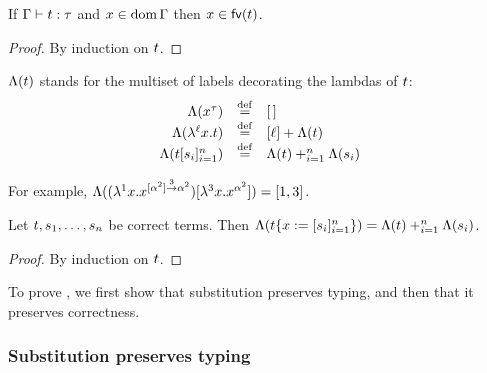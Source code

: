 \begin{lemma}[Relevance]
If $\Gamma \vdash t : \tau$
and $x \in \operatorname{dom}\Gamma$ then $x \in \mathsf{fv}({t})$.
\end{lemma}
\begin{proof}
By induction on $t$.
\end{proof}

\begin{definition}
$\Lambda(t)$ stands for the multiset of labels decorating the lambdas of $t$:
\[
  \begin{array}{rcl}
    \Lambda(x^\tau) & \overset{\mathrm{def}}{=} & [\,] \\
    \Lambda(\lambda^{\ell} x. t) & \overset{\mathrm{def}}{=} & [\ell] + \Lambda(t)  \\
    \Lambda(t[s_i]_{i=1}^{n}) & \overset{\mathrm{def}}{=} & \Lambda(t) +_{i=1}^{n} \Lambda(s_i)  \\
  \end{array}
\]
\end{definition}
For example, $\Lambda((\lambda^{1} x. x^{[\alpha^2] \overset{3}{\to} \alpha^2})[\lambda^{3} x. x^{\alpha^2}]) = [1,3]$.

\begin{lemma}
Let $t,s_1,\hdots,s_n$ be correct terms.
Then
$\Lambda(t\{x := [s_i]_{i=1}^{n}\}) = \Lambda(t) +_{i=1}^n \Lambda(s_i)$.
\end{lemma}
\begin{proof}
By induction on $t$.
\end{proof}

To prove , we first show that substitution preserves typing,
and then that it preserves correctness.

\subsubsection{Substitution preserves typing}


